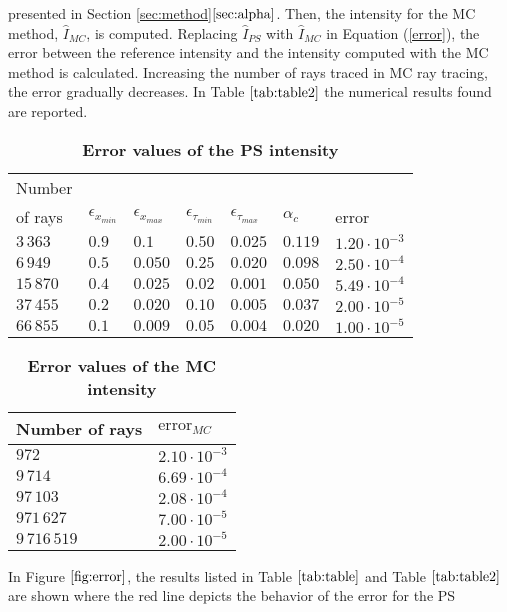 presented in Section \ref{sec:method}$\ref{sec:alpha}$.
 Then, the intensity for the MC method, $\hat{I}_{MC}$, is computed.
Replacing $\hat{I}_{PS}$ with $\hat{I}_{MC}$ in Equation (\ref{error}), the error between the reference intensity and the intensity computed with the MC method is
calculated.
Increasing the number of rays traced in MC ray tracing, the error gradually decreases.
In Table $\ref{tab:table2}$ the numerical results found are reported.
\begin{table}[htbp] \label{tab:table}
\centering
\caption{\bf Error values of the PS intensity}
\begin{tabular}{lllllll}
 \hline  Number \\ of rays\;  & $\epsilon_{x_{min}} $  & $\epsilon_{x_{max}} $   \;     & $\epsilon_{\tau_{min}}$\;
  & $\epsilon_{\tau_{max}}$\; & $\alpha_c$  & error \\
  \hline 
 $3\,363$ & $0.9$  & $0.1$  & $0.50$  & $0.025$ & $0.119$ & $1.20\cdot10^{-3}$ \\
$6\,949$  & $0.5$  & $0.050$  & $0.25$  & $0.020$ & $0.098$ & $2.50\cdot 10^{-4}$  \\
$15\,870$  & $0.4$  & $0.025$  & $0.02$  & $0.001$ & $0.050$ & $5.49\cdot 10^{-4}$ \\
 $37\,455$  & $0.2$  & $0.020$  & $0.10$ & $0.005$ & $0.037$ & $2.00\cdot 10^{-5}$ \\
 $66\,855$ & $0.1$  & $0.009$  & $0.05$  & $0.004$ & $0.020$ & $1.00\cdot 10^{-5}$ \\
 \hline
 \end{tabular}
 \label{tab:table}
 \end{table}
\begin{table}[htbp]
\centering
\caption{\bf Error values of the MC intensity}
\begin{tabular}{ll} \hline   Number of rays\; & $\mbox{error}_{MC}$\\ \hline $972$  & $2.10\cdot10^{-3}$ \\
$9\,714$  & $6.69\cdot 10^{-4}$  \\ $97\,103$  & $2.08\cdot 10^{-4}$ \\ $971\,627$  & $7.00\cdot 10^{-5}$ \\ $9\,716\,519$  & $2.00\cdot 10^{-5}$ \\
 \hline
 \end{tabular}
 \label{tab:table2}
 \end{table}
\noindent In Figure $\ref{fig:error}$, the results listed in Table $\ref{tab:table}$ and Table $\ref{tab:table2}$ are shown where the red line depicts the behavior of the error for the PS

